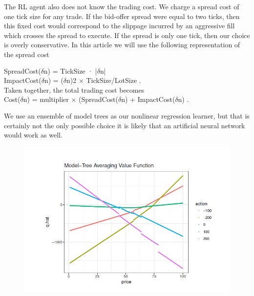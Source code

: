 \documentclass{article}
\begin{document}
The RL agent also does not know the trading cost. We charge a spread cost of one tick size for any trade. If the bid-offer spread were equal to two ticks, then this fixed cost would correspond to the slippage incurred by an aggressive fill which crosses the spread to execute. If the spread is only one tick, then our choice is overly conservative. In this article we will use the following representation of the spread cost\\
\begin{center}
SpreadCost($\delta$n) = TickSize · |$\delta$n|\\
ImpactCost($\delta$n) = ($\delta$n)2 × TickSize/LotSize .\\
Taken together, the total trading cost becomes\\
Cost($\delta$n) = multiplier × (SpreadCost($\delta$n) + ImpactCost($\delta$n) .\\
\end{center}

We use an ensemble of model trees as our nonlinear regression learner, but that is certainly not the only possible choice it is likely that an artificial neural network would work as well.

\begin{figure}[H]
\begin{center}
\includegraphics[scale = 0.5]{Avg.png}
\end{center}
\end{figure}
\end{document}
